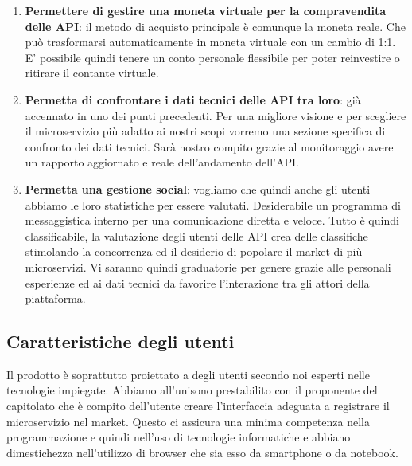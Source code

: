 \documentclass[12pt,a4paper,titlepage]{article}
\begin{document}
\begin{enumerate}
		\item \textbf{Permettere di gestire una moneta virtuale per la compravendita delle API}:	il metodo di acquisto principale è comunque la moneta reale. Che può trasformarsi automaticamente in moneta virtuale con un cambio di 1:1. E' possibile quindi tenere un conto personale flessibile per poter reinvestire o ritirare il contante virtuale. 
		\item \textbf{Permetta di confrontare i dati tecnici delle API tra loro}:	già accennato in uno dei punti precedenti. Per una migliore visione e per scegliere il microservizio più adatto ai nostri scopi vorremo una sezione specifica di confronto dei dati tecnici. Sarà nostro compito grazie al monitoraggio avere un rapporto aggiornato e reale dell'andamento dell'API.
		\item \textbf{Permetta una gestione social}:	vogliamo che quindi anche gli utenti abbiamo le loro statistiche per essere valutati. Desiderabile un programma di messaggistica interno per una comunicazione diretta e veloce. Tutto è quindi classificabile, la valutazione degli utenti delle API crea delle classifiche stimolando la concorrenza ed il desiderio di popolare il market di più microservizi. Vi saranno quindi graduatorie per genere grazie alle personali esperienze ed ai dati tecnici da favorire l'interazione tra gli attori della piattaforma.
	\end{enumerate}
	\subsection{Caratteristiche degli utenti}
	Il prodotto è soprattutto proiettato a degli utenti secondo noi esperti nelle tecnologie impiegate. Abbiamo all'unisono prestabilito con il proponente del capitolato che è compito dell'utente creare l'interfaccia adeguata a registrare il microservizio nel market. Questo ci assicura una minima competenza nella programmazione e quindi nell'uso di tecnologie informatiche e abbiano dimestichezza nell'utilizzo di browser che sia esso da smartphone o da notebook.
	
\end{document}
